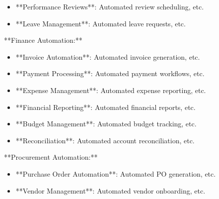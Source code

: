 \documentclass[11pt,a4paper]{article}
\begin{document}
\begin{itemize}
\item **Performance Reviews**: Automated review scheduling, etc.
\end{itemize}

\begin{itemize}
\item **Leave Management**: Automated leave requests, etc.
\end{itemize}

**Finance Automation:**

\begin{itemize}
\item **Invoice Automation**: Automated invoice generation, etc.
\end{itemize}

\begin{itemize}
\item **Payment Processing**: Automated payment workflows, etc.
\end{itemize}

\begin{itemize}
\item **Expense Management**: Automated expense reporting, etc.
\end{itemize}

\begin{itemize}
\item **Financial Reporting**: Automated financial reports, etc.
\end{itemize}

\begin{itemize}
\item **Budget Management**: Automated budget tracking, etc.
\end{itemize}

\begin{itemize}
\item **Reconciliation**: Automated account reconciliation, etc.
\end{itemize}

**Procurement Automation:**

\begin{itemize}
\item **Purchase Order Automation**: Automated PO generation, etc.
\end{itemize}

\begin{itemize}
\item **Vendor Management**: Automated vendor onboarding, etc.
\end{itemize}
\end{document}

